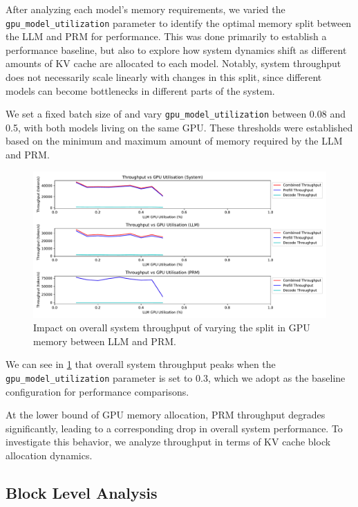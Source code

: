 \documentclass[12pt,twoside]{report}
\begin{document}
After analyzing each model's memory requirements, we varied the \texttt{gpu\_model\_utilization} parameter to identify the optimal memory split between the LLM and PRM for performance. 
This was done primarily to establish a performance baseline, but also to explore how system dynamics shift as different amounts of KV cache are allocated to each model. 
Notably, system throughput does not necessarily scale linearly with changes in this split, since different models can become bottlenecks in different parts of the system.

We set a fixed batch size of and vary \texttt{gpu\_model\_utilization} between 0.08 and 0.5, with both models living on the same GPU.
These thresholds were established based on the minimum and maximum amount of memory required by the LLM and PRM.

\begin{figure}[htbp]
  \centering
  \includegraphics[width=\textwidth]{figures/system_throughput_gpu_utilisation.pdf}
  \caption{Impact on overall system throughput of varying the split in GPU memory between LLM and PRM.}
  \label{fig:system_throughput_gpu_utilisation}
\end{figure}

We can see in \ref{fig:system_throughput_gpu_utilisation} that overall system throughput peaks when the \texttt{gpu\_model\_utilization} parameter is set to 0.3, which we adopt as the baseline configuration for performance comparisons.

At the lower bound of GPU memory allocation, PRM throughput degrades significantly, leading to a corresponding drop in overall system performance. 
To investigate this behavior, we analyze throughput in terms of KV cache block allocation dynamics.

\subsection{Block Level Analysis}
\end{document}
